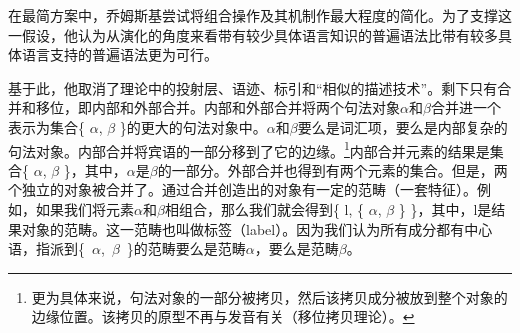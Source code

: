 在最简方案中，乔姆斯基尝试将组合操作及其机制作最大程度的简化。为了支撑这一假设，他认为从演化的角度来看带有较少具体语言知识的普遍语法比带有较多具体语言支持的普遍语法更为可行\citep[]{Chomsky2008a}。

基于此，他取消了\xbarc 理论中的投射层、语迹、标引和“相似的描述技术”\citep[]{Chomsky2008a}。剩下只有合并和移位，即内部和外部合并。内部和外部合并将两个句法对象$\alpha$和$\beta$合并进一个表示为集合\{ $\alpha$, $\beta$ \}的更大的句法对象中。$\alpha$和$\beta$要么是词汇项，要么是内部复杂的句法对象。内部合并将宾语的一部分移到了它的边缘。\footnote{%
更为具体来说，句法对象的一部分被拷贝，然后该拷贝成分被放到整个对象的边缘位置。该拷贝的原型不再与发音有关（移位拷贝理论）。
}内部合并元素的结果是集合\{ $\alpha$, $\beta$ \}，其中，$\alpha$是$\beta$的一部分。外部合并也得到有两个元素的集合。但是，两个独立的对象被合并了。通过合并创造出的对象有一定的范畴（一套特征）。例如，如果我们将元素$\alpha$和$\beta$相组合，那么我们就会得到\{ l, \{ $\alpha$, $\beta$ \} \}，其中，l是结果对象的范畴。这一范畴也叫做标签（label）。因为我们认为所有成分都有中心语，指派到\{~$\alpha$,~$\beta$~\}的范畴要么是范畴$\alpha$，要么是范畴$\beta$。
